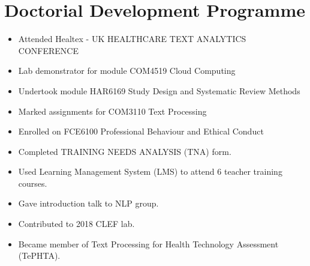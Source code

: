 \chapter{Doctorial Development Programme} \label{lit}


\begin{itemize}
  \item Attended Healtex - UK HEALTHCARE TEXT ANALYTICS CONFERENCE
  \item Lab demonstrator for module COM4519 Cloud Computing
  \item Undertook module HAR6169 Study Design and Systematic Review Methods
  \item Marked assignments for COM3110 Text Processing
  \item Enrolled on FCE6100 Professional Behaviour and Ethical Conduct
  \item Completed TRAINING NEEDS ANALYSIS (TNA) form.
  \item Used Learning Management System (LMS) to attend 6 teacher training courses.
  \item Gave introduction talk to NLP group.
  \item Contributed to 2018 CLEF lab.
  \item Became member of Text Processing for Health Technology Assessment (TePHTA).
  
\end{itemize}
